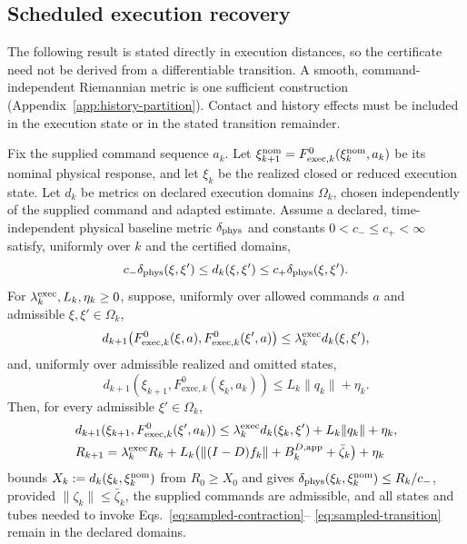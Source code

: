 \subsection{Scheduled execution recovery}
The following result is stated directly in execution distances, so the
certificate need not be derived from a differentiable transition. A smooth,
command-independent Riemannian metric is one sufficient construction
(Appendix~\ref{app:history-partition}). Contact and history effects must be
included in the execution state or in the stated transition remainder.
\begin{theorem}
\label{thm:tube}
Fix the supplied command sequence $a_k$. Let
$\xi_{k+1}^{\rm nom}=F_{\mathrm{exec},k}^0(\xi_k^{\rm nom},a_k)$ be its nominal
physical response, and let $\xi_k$ be the realized closed or reduced execution
state. Let $d_k$ be metrics on declared execution domains $\Omega_k$, chosen
independently of the supplied command and adapted estimate. Assume a declared,
time-independent physical baseline metric $\delta_{\rm phys}$ and constants
$0<c_-\le c_+<\infty$ satisfy, uniformly over $k$ and the certified domains,
\begin{equation}
c_-\delta_{\rm phys}(\xi,\xi')\le d_k(\xi,\xi')
\le c_+\delta_{\rm phys}(\xi,\xi').
\label{eq:distance-equivalence}
\end{equation}
For
$\lambda_k^{\rm exec},L_k,\eta_k\ge0$, suppose, uniformly over allowed commands
$a$ and admissible $\xi,\xi'\in\Omega_k$,
\begin{equation}
d_{k+1}\!\left(F_{\mathrm{exec},k}^0(\xi,a),
F_{\mathrm{exec},k}^0(\xi',a)\right)
\le \lambda_k^{\rm exec}d_k(\xi,\xi'),
\label{eq:sampled-contraction}
\end{equation}
and, uniformly over admissible realized and omitted states,
\begin{equation}
d_{k+1}(\xi_{k+1},F_{\mathrm{exec},k}^0(\xi_k,a_k))
\le L_k\|q_k\|+\eta_k.
\label{eq:sampled-transition}
\end{equation}
Then, for every admissible $\xi'\in\Omega_k$,
\begin{align}
&d_{k+1}(\xi_{k+1},F_{\mathrm{exec},k}^0(\xi',a_k))
\le \lambda_k^{\rm exec}d_k(\xi_k,\xi')+L_k\|q_k\|+\eta_k,
\label{eq:incremental}\\
&R_{k+1}=\lambda_k^{\rm exec}R_k+L_k\big(\|(I-D)f_k\|+B_k^{D,\rm app}+\bar\zeta_k\big)+\eta_k
\label{eq:tube}
\end{align}
bounds $X_k:=d_k(\xi_k,\xi_{k}^{\rm nom})$ from $R_0\ge X_0$ and gives
$\delta_{\rm phys}(\xi_k,\xi_k^{\rm nom})\le R_k/c_-$, provided
$\|\zeta_k\|\le\bar\zeta_k$, the supplied commands are admissible, and all
states and tubes needed to invoke Eqs.~\eqref{eq:sampled-contraction}--
\eqref{eq:sampled-transition} remain in the declared domains.
\end{theorem}
